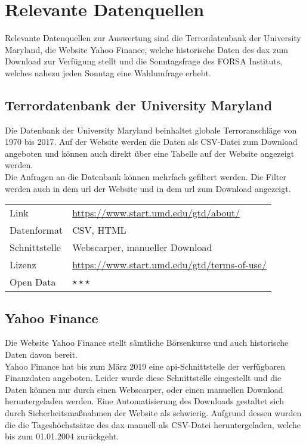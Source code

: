 \documentclass[a4paper,10pt,parskip]{article}
\begin{document}
\section{Relevante Datenquellen}

Relevante Datenquellen zur Auswertung sind die Terrordatenbank der University Maryland, die Website Yahoo Finance, welche historische Daten des \ac{dax} zum Download zur Verfügung stellt und die Sonntagsfrage des FORSA Instituts, welches nahezu jeden Sonntag eine Wahlumfrage erhebt.

\subsection{Terrordatenbank der University Maryland}

Die Datenbank der University Maryland beinhaltet globale Terroranschläge von 1970 bis 2017. Auf der Website werden die Daten als CSV-Datei zum Download angeboten und können auch direkt über eine Tabelle auf der Website angezeigt werden.\\ Die Anfragen an die Datenbank können mehrfach gefiltert werden. Die Filter werden auch in dem \ac{url} der Website und in dem \ac{url} zum Download angezeigt.

\vspace{0.5cm}
\begin{tabular}{l|p{9cm}}
	Link & \url{https://www.start.umd.edu/gtd/about/} \\
 	Datenformat & CSV, HTML \\
 	Schnittstelle & Webscarper, manueller Download \\
 	Lizenz & \url{https://www.start.umd.edu/gtd/terms-of-use/} \\
 	Open Data & $\star\star\star$ \\
\end{tabular}

\subsection{Yahoo Finance}

Die Website Yahoo Finance stellt sämtliche Börsenkurse und auch historische Daten davon bereit.\\
Yahoo Finance hat bis zum März 2019 eine \ac{api}-Schnittstelle der verfügbaren Finanzdaten angeboten. Leider wurde diese Schnittstelle eingestellt und die Daten können nur durch einen Webscarper, oder einen manuellen Download heruntergeladen werden. Eine Automatisierung des Downloads gestaltet sich durch Sicherheitsmaßnahmen der Website als schwierig. Aufgrund dessen wurden die die Tageshöchstsätze des \ac{dax} manuell als CSV-Datei heruntergeladen, welche bis zum 01.01.2004 zurückgeht.
\end{document}

